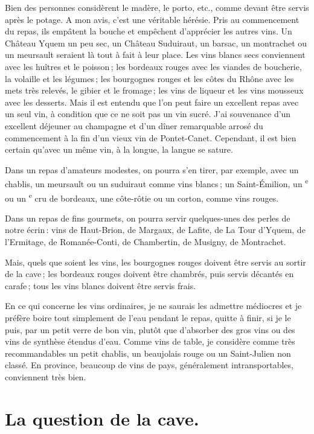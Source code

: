 Bien des personnes considèrent le madère, le porto, etc., comme devant être
servis après le potage. A mon avis, c'est une véritable hérésie. Pris au
commencement du repas, ils empâtent la bouche et empêchent d'apprécier les
autres vins. Un Château Yquem un peu sec, un Château Suduiraut, un barsac, un
montrachet ou un meursault seraient là tout à fait à leur place. Les vins
blancs secs conviennent avec les huîtres et le poisson ; les bordeaux rouges
avec les viandes de boucherie, la volaille et les légumes ; les bourgognes
rouges et les côtes du Rhône avec les mets très relevés, le gibier et le
fromage ; les vins de liqueur et les vins mousseux avec les desserts. Mais il
est entendu que l'on peut faire un excellent repas avec un seul vin,
à condition que ce ne soit pas un vin sucré. J'ai souvenance d'un excellent
déjeuner au champagne et d’un dîner remarquable arrosé du commencement à la fin
d'un vieux vin de Pontet-Canet. Cependant, il est bien certain qu'avec un même
vin, à la longue, la langue se sature.

Dans un repas d'amateurs modestes, on pourra s'en tirer, par exemple, avec un
chablis, un meursault ou un suduiraut comme vins blancs ; un Saint-Émilion, un
{\mmm}\textsuperscript{e} ou un {\mmm}\textsuperscript{e} cru de
bordeaux, une côte-rôtie ou un corton, comme vins rouges.

Dans un repas de fins gourmets, on pourra servir quelques-unes des perles de
notre écrin : vins de Haut-Brion, de Margaux, de Lafite, de La Tour d'Yquem, de
l'Ermitage, de Romanée-Conti, de Chambertin, de Musigny, de Montrachet.

Mais, quels que soient les vins, les bourgognes rouges doivent être servis au
sortir de la cave ; les bordeaux rouges doivent être chambrés, puis servis
décantés en carafe ; tous les vins blancs doivent être servis frais.

En ce qui concerne les vins ordinaires, je ne saurais les admettre médiocres et
je préfère boire tout simplement de l'eau pendant le repas, quitte à finir, si
je le puis, par un petit verre de bon vin, plutôt que d'absorber des gros vins
ou des vins de synthèse étendus d'eau. Comme vins de table, je considère comme
très recommandables un petit chablis, un beaujolais rouge ou un Saint-Julien
non classé. En province, beaucoup de vins de pays, généralement
intransportables, conviennent très bien.

\section*{\centering La question de la cave.}

